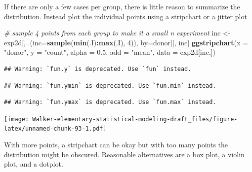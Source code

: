 \documentclass[]{book}
\newenvironment{Shaded}{\begin{snugshade}}{\end{snugshade}}
\newcommand{\CommentTok}[1]{\textcolor[rgb]{0.56,0.35,0.01}{\textit{#1}}}
\newcommand{\DataTypeTok}[1]{\textcolor[rgb]{0.13,0.29,0.53}{#1}}
\newcommand{\DecValTok}[1]{\textcolor[rgb]{0.00,0.00,0.81}{#1}}
\newcommand{\FloatTok}[1]{\textcolor[rgb]{0.00,0.00,0.81}{#1}}
\newcommand{\KeywordTok}[1]{\textcolor[rgb]{0.13,0.29,0.53}{\textbf{#1}}}
\newcommand{\NormalTok}[1]{#1}
\newcommand{\OperatorTok}[1]{\textcolor[rgb]{0.81,0.36,0.00}{\textbf{#1}}}
\newcommand{\StringTok}[1]{\textcolor[rgb]{0.31,0.60,0.02}{#1}}
\begin{document}
If there are only a few cases per group, there is little reason to summarize the distribution. Instead plot the individual points using a stripchart or a jitter plot

\begin{Shaded}
\begin{Highlighting}[]
\CommentTok{# sample 4 points from each group to make it a small n experiment}
\NormalTok{inc <-}\StringTok{ }\NormalTok{exp2d[, .(}\DataTypeTok{inc=}\KeywordTok{sample}\NormalTok{(}\KeywordTok{min}\NormalTok{(.I)}\OperatorTok{:}\KeywordTok{max}\NormalTok{(.I), }\DecValTok{4}\NormalTok{)), by=donor][, inc]}
\KeywordTok{ggstripchart}\NormalTok{(}\DataTypeTok{x =} \StringTok{"donor"}\NormalTok{,}
             \DataTypeTok{y =} \StringTok{"count"}\NormalTok{,}
             \DataTypeTok{alpha =} \FloatTok{0.5}\NormalTok{,}
             \DataTypeTok{add =} \StringTok{"mean"}\NormalTok{,}
             \DataTypeTok{data =}\NormalTok{ exp2d[inc,])}
\end{Highlighting}
\end{Shaded}

\begin{verbatim}
## Warning: `fun.y` is deprecated. Use `fun` instead.
\end{verbatim}

\begin{verbatim}
## Warning: `fun.ymin` is deprecated. Use `fun.min` instead.
\end{verbatim}

\begin{verbatim}
## Warning: `fun.ymax` is deprecated. Use `fun.max` instead.
\end{verbatim}

\texttt{[image: Walker-elementary-statistical-modeling-draft\_files/figure-latex/unnamed-chunk-93-1.pdf]}

With more points, a stripchart can be okay but with too many points the distribution might be obscured. Reasonable alternatives are a box plot, a violin plot, and a dotplot.
\end{document}
